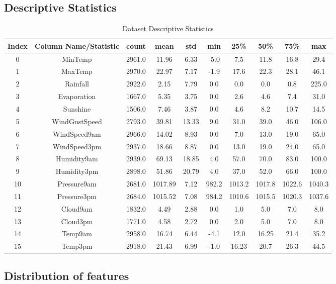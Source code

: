 \documentclass{article}%
\begin{document}
%
\subsection{Descriptive Statistics}%
\label{subsec:DescriptiveStatistics}%


\begin{table}[h!]%
\caption{Dataset Descriptive Statistics}%
\vspace{0.2cm}%
\centering%
\begin{tabular}{|c||c||c||c||c||c||c||c||c||c|}%
\hline%
Index&Column Name/Statistic&count&mean&std&min&25\%&50\%&75\%&max\\%
\hline%
0&MinTemp&2961.0&11.96&6.33&{-}5.0&7.5&11.8&16.8&29.4\\%
1&MaxTemp&2970.0&22.97&7.17&{-}1.9&17.6&22.3&28.1&46.1\\%
2&Rainfall&2922.0&2.15&7.79&0.0&0.0&0.0&0.8&225.0\\%
3&Evaporation&1667.0&5.35&3.75&0.0&2.6&4.6&7.4&31.0\\%
4&Sunshine&1506.0&7.46&3.87&0.0&4.6&8.2&10.7&14.5\\%
5&WindGustSpeed&2793.0&39.81&13.33&9.0&31.0&39.0&46.0&106.0\\%
6&WindSpeed9am&2966.0&14.02&8.93&0.0&7.0&13.0&19.0&65.0\\%
7&WindSpeed3pm&2937.0&18.66&8.87&0.0&13.0&19.0&24.0&65.0\\%
8&Humidity9am&2939.0&69.13&18.85&4.0&57.0&70.0&83.0&100.0\\%
9&Humidity3pm&2898.0&51.86&20.79&4.0&37.0&52.0&66.0&100.0\\%
10&Pressure9am&2681.0&1017.89&7.12&982.2&1013.2&1017.8&1022.6&1040.3\\%
11&Pressure3pm&2684.0&1015.52&7.08&984.2&1010.6&1015.5&1020.3&1037.6\\%
12&Cloud9am&1832.0&4.49&2.88&0.0&1.0&5.0&7.0&8.0\\%
13&Cloud3pm&1771.0&4.58&2.72&0.0&2.0&5.0&7.0&8.0\\%
14&Temp9am&2958.0&16.74&6.44&{-}4.1&12.0&16.25&21.4&35.2\\%
15&Temp3pm&2918.0&21.43&6.99&{-}1.0&16.23&20.7&26.3&44.5\\%
\hline%
\end{tabular}%
\end{table}

%
\newpage%
\subsection{Distribution of features}%
\label{subsec:Distributionoffeatures}%
\end{document}

